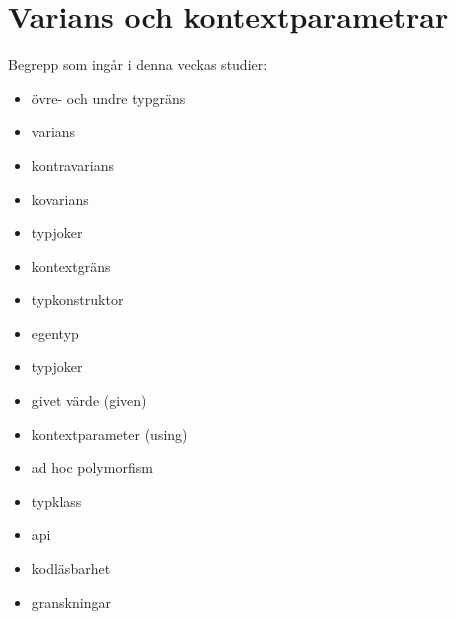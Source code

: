 \chapter{Varians och kontextparametrar}\label{chapter:W11}
Begrepp som ingår i denna veckas studier:
\begin{itemize}[noitemsep,label={$\square$},leftmargin=*]
\item övre- och undre typgräns
\item varians
\item kontravarians
\item kovarians
\item typjoker
\item kontextgräns
\item typkonstruktor
\item egentyp
\item typjoker
\item givet värde (given)
\item kontextparameter (using)
\item ad hoc polymorfism
\item typklass
\item api
\item kodläsbarhet
\item granskningar\end{itemize}
